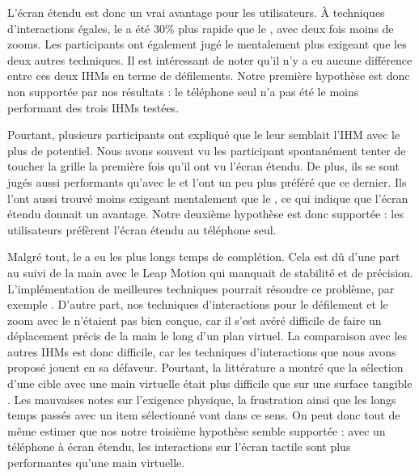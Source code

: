 
L'écran étendu est donc un vrai avantage pour les utilisateurs. À techniques d'interactions égales, le  a été 30\% plus rapide que le , avec deux fois moins de zooms. Les participants ont également jugé le  mentalement plus exigeant que les deux autres techniques. Il est intéressant de noter qu'il n'y a eu aucune différence entre ces deux IHMs en terme de défilements. Notre première hypothèse est donc non supportée par nos résultats : le téléphone seul n'a pas été le moins performant des trois IHMs testées.

Pourtant, plusieurs participants ont expliqué que le  leur semblait l'IHM avec le plus de potentiel. Nous avons souvent vu les participant spontanément tenter de toucher la grille la première fois qu'il ont vu l'écran étendu. De plus, ils se sont jugés aussi performants qu'avec le  et l'ont un peu plus préféré que ce dernier. Ils l'ont aussi trouvé moins exigeant mentalement que le , ce qui indique que l'écran étendu donnait un avantage. Notre deuxième hypothèse est donc supportée : les utilisateurs préfèrent l'écran étendu au téléphone seul.

Malgré tout, le  a eu les plus longs temps de complétion. Cela est dû d'une part au suivi de la main avec le Leap Motion qui manquait de stabilité et de précision. L'implémentation de meilleures techniques pourrait résoudre ce problème, par exemple \cite{Taylor2016}. D'autre part, nos techniques d'interactions pour le défilement et le zoom avec le  n'étaient pas bien conçue, car il s'est avéré difficile de faire un déplacement précis de la main le long d'un plan virtuel. La comparaison avec les autres IHMs est donc difficile, car les techniques d'interactions que nous avons proposé jouent en sa défaveur. Pourtant, la littérature a montré que la sélection d'une cible avec une main virtuelle était plus difficile que sur une surface tangible \citep{Chan2010, Jones2012, Argelaguet2013}. Les mauvaises notes sur l'exigence physique, la frustration ainsi que les longs temps passés avec un item sélectionné vont dans ce sens. On peut donc tout de même estimer que nos notre troisième hypothèse semble supportée : avec un téléphone à écran étendu, les interactions sur l'écran tactile sont plus performantes qu'une main virtuelle.

